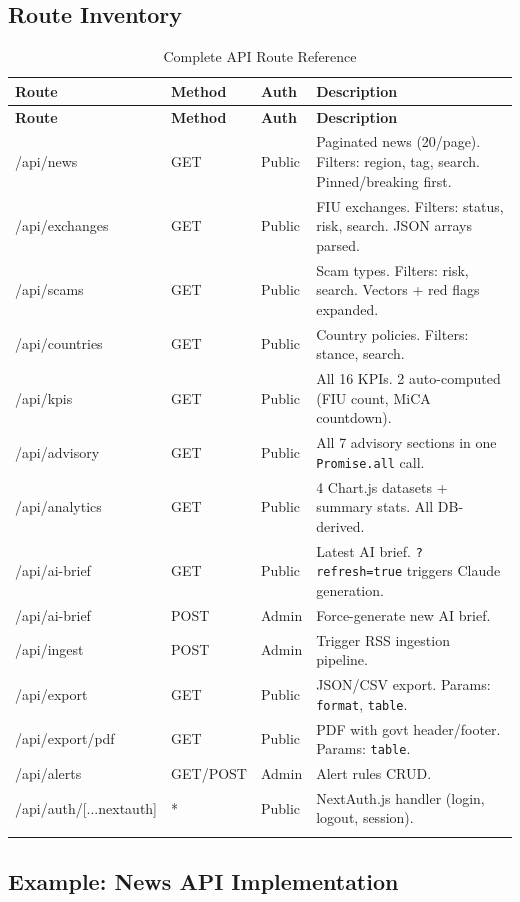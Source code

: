 \documentclass[12pt,a4paper]{article}
\begin{document}
\subsection{Route Inventory}

\begin{longtable}{p{3cm}p{1.5cm}p{2.5cm}p{5.5cm}}
\toprule
\textbf{Route} & \textbf{Method} & \textbf{Auth} & \textbf{Description} \\
\midrule
\endfirsthead
\toprule
\textbf{Route} & \textbf{Method} & \textbf{Auth} & \textbf{Description} \\
\midrule
\endhead
/api/news & GET & Public & Paginated news (20/page). Filters: region, tag, search. Pinned/breaking first. \\
/api/exchanges & GET & Public & FIU exchanges. Filters: status, risk, search. JSON arrays parsed. \\
/api/scams & GET & Public & Scam types. Filters: risk, search. Vectors + red flags expanded. \\
/api/countries & GET & Public & Country policies. Filters: stance, search. \\
/api/kpis & GET & Public & All 16 KPIs. 2 auto-computed (FIU count, MiCA countdown). \\
/api/advisory & GET & Public & All 7 advisory sections in one \texttt{Promise.all} call. \\
/api/analytics & GET & Public & 4 Chart.js datasets + summary stats. All DB-derived. \\
/api/ai-brief & GET & Public & Latest AI brief. \texttt{?refresh=true} triggers Claude generation. \\
/api/ai-brief & POST & Admin & Force-generate new AI brief. \\
/api/ingest & POST & Admin & Trigger RSS ingestion pipeline. \\
/api/export & GET & Public & JSON/CSV export. Params: \texttt{format}, \texttt{table}. \\
/api/export/pdf & GET & Public & PDF with govt header/footer. Params: \texttt{table}. \\
/api/alerts & GET/POST & Admin & Alert rules CRUD. \\
/api/auth/[...nextauth] & * & Public & NextAuth.js handler (login, logout, session). \\
\bottomrule
\caption{Complete API Route Reference}
\label{tab:api}
\end{longtable}

\subsection{Example: News API Implementation}
\end{document}
